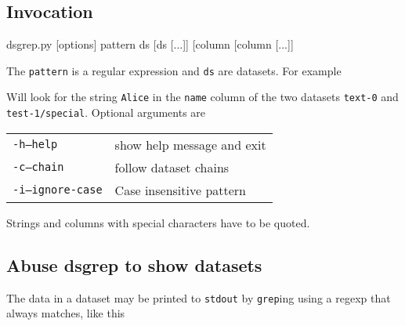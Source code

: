 \subsection{Invocation}
\begin{shell}
dsgrep.py [options] pattern ds [ds [...]] [column [column [...]]
\end{shell}
The \texttt{pattern} is a regular expression and \texttt{ds} are datasets.  For example
\begin{shell}
\end{shell}
Will look for the string \texttt{Alice} in the \texttt{name} column of
the two datasets \texttt{text-0} and \texttt{test-1/special}.
Optional arguments are
\begin{snugshade}
  \begin{tabular}{p{4cm}p{9cm}}
      \texttt{-h}\hspace{3cm}\texttt{--help} & show help message and exit\\[4ex]
      \texttt{-c}\hspace{3cm}\texttt{--chain} & follow dataset chains\\[4ex]
      \texttt{-i}\hspace{3cm}\texttt{--ignore-case} & Case insensitive pattern\\[4ex]
  \end{tabular}
\end{snugshade}
Strings and columns with special characters have to be quoted.



\subsection{Abuse dsgrep to show datasets}
The data in a dataset may be printed to \texttt{stdout} by
\texttt{grep}ing using a regexp that always matches, like this
\begin{shell}
\end{shell}
